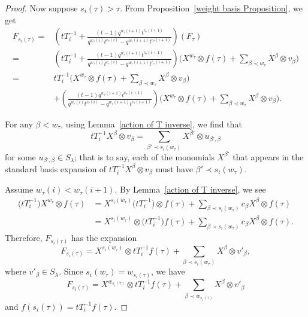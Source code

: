 \documentclass[10pt,a4paper]{amsart}
\numberwithin{equation}{section}
\theoremstyle{definition}
\begin{document}
\begin{proof}
 Now suppose $s_i(\tau) > \tau$. From Proposition~\ref{weight basis Proposition}, we get
 \begin{align*}
 F_{s_i(\tau)} ={}& \left( tT_{i}^{-1} + \frac{(t-1)q^{w_{\tau}(i+1)}t^{c_{\tau}(i+1)}}{q^{w_{\tau}(i)}t^{c_{\tau}(i)}-q^{w_{\tau}(i+1)}t^{c_{\tau}(i+1)}}\right)(F_{\tau}) \\
 ={}& \left( tT_{i}^{-1} + \frac{(t-1)q^{w_{\tau}(i+1)}t^{c_{\tau}(i+1)}}{q^{w_{\tau}(i)}t^{c_{\tau}(i)}-q^{w_{\tau}(i+1)}t^{c_{\tau}(i+1)}}\right) \biggl(X^{w_{\tau}}\otimes f(\tau) + \sum_{\beta \prec w_{\tau}} X^{\beta}\otimes v_{\beta} \biggr) \\
 ={}& tT_{i}^{-1}\biggl(X^{w_{\tau}}\otimes f(\tau) + \sum_{\beta \prec w_{\tau}} X^{\beta}\otimes v_{\beta} \biggr) \\
 & + \left(\frac{(t-1)q^{w_{\tau}(i+1)}t^{c_{\tau}(i+1)}}{q^{w_{\tau}(i)}t^{c_{\tau}(i)}-q^{w_{\tau}(i+1)}t^{c_{\tau}(i+1)}}\right) \biggl(X^{w_{\tau}}\otimes f(\tau) + \sum_{\beta \prec w_{\tau}} X^{\beta}\otimes v_{\beta} \biggr).
 \end{align*}

 For any $\beta < w_{\tau}$, using Lemma~\ref{action of T inverse}, we find that
 \[
 tT_i^{-1}X^{\beta} \otimes v_{\beta} = \sum_{\beta' \prec s_i(w_{\tau})}X^{\beta'} \otimes u_{\beta',\beta}
 \]
 for some $u_{\beta',\beta} \in S_{\lambda}$; that is to say, each of the monomials $X^{\beta'}$ that appears in the standard basis expansion of $tT_i^{-1}X^{\beta} \otimes v_{\beta}$ must have $\beta'\prec s_i(w_{\tau})$.

 Assume $w_{\tau}(i)< w_{\tau}(i+1)$. By Lemma~\ref{action of T inverse}, we see
 \begin{align*}
 \bigl(tT_i^{-1}\bigr)X^{w_{\tau}}\otimes f(\tau) &= X^{s_i(w_{\tau})}\bigl(tT_i^{-1}\bigr)\otimes f(\tau) + \sum_{\beta \prec s_i(w_{\tau})} c_{\beta}X^{\beta}\otimes f(\tau) \\
 & = X^{s_i(w_{\tau})}\otimes \bigl(tT_i^{-1}\bigr)f(\tau) + \sum_{\beta \prec s_i(w_{\tau})} c_{\beta}X^{\beta}\otimes f(\tau).
 \end{align*}
 Therefore, $F_{s_i(\tau)}$ has the expansion
 \[
 F_{s_i(\tau)} = X^{s_i(w_{\tau})}\otimes tT_i^{-1}f(\tau) + \sum_{\beta \prec s_i(w_{\tau})} X^{\beta}\otimes v'_{\beta},
 \]
 where $v'_{\beta} \in S_{\lambda}$. Since $s_i(w_{\tau}) = w_{s_{i}(\tau)}$, we have
 \[
 F_{s_i(\tau)} = X^{w_{s_{i}(\tau)}}\otimes tT_i^{-1}f(\tau) + \sum_{\beta \prec w_{s_{i}(\tau)}} X^{\beta}\otimes v'_{\beta}
 \]
 and $f(s_i(\tau)) = tT_i^{-1}f(\tau)$.


\end{proof}
\end{document}
